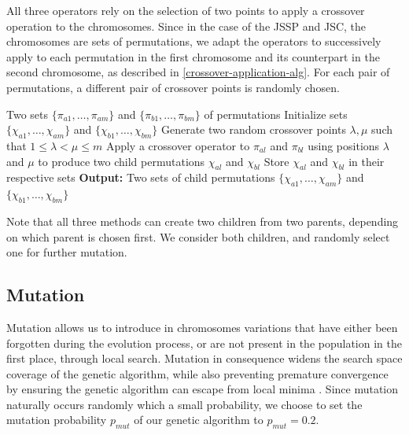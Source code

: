 \documentclass{mimosis}
\begin{document}
All three operators rely on the selection of two points to apply a crossover operation to the chromosomes. Since in the case of the JSSP and JSC, the chromosomes are sets of permutations, we adapt the operators to successively apply to each permutation in the first chromosome and its counterpart in the second chromosome, as described in \cref{crossover-application-alg}. For each pair of permutations, a different pair of crossover points is randomly chosen.

\begin{algorithm}
\begin{spacing}{1.2}  %
 \label{crossover-application-alg}
\begin{algorithmic}[1]
\Require Two sets \(\{\pi_{a1}, \ldots, \pi_{am}\}\) and \(\{\pi_{b1}, \ldots, \pi_{bm}\}\) of permutations
\State Initialize sets \(\{\chi_{a1}, \ldots, \chi_{am}\}\) and \(\{\chi_{b1}, \ldots, \chi_{bm}\}\)
    \State Generate two random crossover points \(\lambda, \mu\) such that \(1 \leq \lambda < \mu \leq m\)
    \State Apply a crossover operator to \(\pi_{al}\) and \(\pi_{bl}\) using positions \(\lambda\) and \(\mu\) to produce two child permutations \(\chi_{al}\) and \(\chi_{bl}\)
    \State Store \(\chi_{al}\) and \(\chi_{bl}\) in their respective sets
\EndFor
\Statex \textbf{Output:} Two sets of child permutations \(\{\chi_{a1}, \ldots, \chi_{am}\}\) and \(\{\chi_{b1}, \ldots, \chi_{bm}\}\)
\end{algorithmic}
\end{spacing}
\end{algorithm}

Note that all three methods can create two children from two parents, depending on which parent is chosen first. We consider both children, and randomly select one for further mutation. 

\subsection{Mutation} \label{mutation}
Mutation allows us to introduce in chromosomes variations that have either been forgotten during the evolution process, or are not present in the population in the first place, through local search. Mutation in consequence widens the search space coverage of the genetic algorithm, while also preventing premature convergence by ensuring the genetic algorithm can escape from local minima \citep[p.~110]{holland1975adaptation}. Since mutation naturally occurs randomly which a small probability, we choose to set the mutation probability \(p_{mut}\) of our genetic algorithm to \(p_{mut} = 0.2\). 
\end{document}

